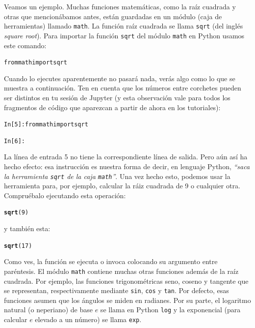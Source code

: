 \documentclass[10pt,a4paper]{article}\usepackage[]{graphicx}\usepackage[]{color}
\makeatletter
\newcommand{\hlnum}[1]{\textcolor[rgb]{0.686,0.059,0.569}{#1}}%
\newcommand{\hlstd}[1]{\textcolor[rgb]{0.345,0.345,0.345}{#1}}%
\newcommand{\hlkwd}[1]{\textcolor[rgb]{0.737,0.353,0.396}{\textbf{#1}}}%
\newenvironment{kframe}{%
 \def\at@end@of@kframe{}%
 \ifinner\ifhmode%
  \def\at@end@of@kframe{\end{minipage}}%
  \begin{minipage}{\columnwidth}%
 \fi\fi%
 \def\FrameCommand##1{\hskip\@totalleftmargin \hskip-\fboxsep
 \colorbox{shadecolor}{##1}\hskip-\fboxsep
     \hskip-\linewidth \hskip-\@totalleftmargin \hskip\columnwidth}%
 \MakeFramed {\advance\hsize-\width
   \@totalleftmargin\z@ \linewidth\hsize
   \@setminipage}}%
 {\par\unskip\endMakeFramed%
 \at@end@of@kframe}
\newenvironment{knitrout}{}{} %
\newcounter {cont01}
\makeatother
\begin{document}
Veamos un ejemplo. Muchas funciones matemáticas, como la raíz cuadrada y otras que mencionábamos antes, están guardadas en un módulo (caja de herramientas) llamado {\tt math}. La función raíz cuadrada se llama {\tt sqrt} (del inglés {\em square root}).  Para importar la función {\tt sqrt} del módulo {\tt math} en Python usamos este comando:
\begin{knitrout}
\color{fgcolor}\begin{kframe}
\begin{alltt}
from math import sqrt
\end{alltt}
\end{kframe}
\end{knitrout}
Cuando lo ejecutes aparentemente no pasará nada, verás algo como lo que se muestra a continuación. Ten en cuenta que los números entre corchetes pueden ser distintos en tu sesión de Jupyter (y esta observación vale para todos los fragmentos de código que aparezcan a partir de ahora en los tutoriales):
\begin{knitrout}
\color{fgcolor}\begin{kframe}
\begin{alltt}
In [5]: from math import sqrt

In [6]:
\end{alltt}
\end{kframe}
\end{knitrout}
La línea de entrada 5 no tiene la correspondiente línea de salida. Pero aún así ha hecho efecto: esa instrucción es nuestra forma de decir, en lenguaje Python, {\em ``saca la herramienta {\tt sqrt} de la caja {\tt math}''}. Una vez hecho esto, podemos usar la herramienta para, por ejemplo, calcular la ráiz cuadrada de 9 o cualquier otra. Compruébalo ejecutando esta operación:
\begin{knitrout}
\color{fgcolor}\begin{kframe}
\begin{alltt}
\hlkwd{sqrt}\hlstd{(}\hlnum{9}\hlstd{)}
\end{alltt}
\end{kframe}
\end{knitrout}
y también esta:
\begin{knitrout}
\color{fgcolor}\begin{kframe}
\begin{alltt}
\hlkwd{sqrt}\hlstd{(}\hlnum{17}\hlstd{)}
\end{alltt}
\end{kframe}
\end{knitrout}
Como ves, la función se ejecuta o {\sf invoca} colocando su argumento entre paréntesis. El módulo {\tt math} contiene muchas otras funciones además de la raíz cuadrada. Por ejemplo, las funciones trigonométricas seno, coseno y tangente que se representan, respectivamente mediante  {\tt sin}, {\tt cos} y {\tt tan}. Por defecto, esas funciones asumen que los ángulos se miden en radianes. Por su parte, el logaritmo natural (o neperiano) de base $e$ se llama en Python {\tt log} y la exponencial (para calcular $e$ elevado a un número) se llama  {\tt exp}.
\end{document}
